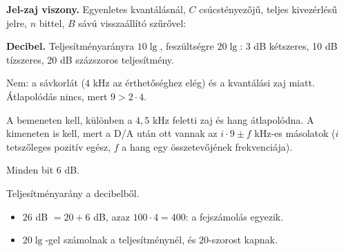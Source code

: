 \begin{elmelet}
\textbf{Jel-zaj viszony.} Egyenletes kvantálásnál, $C$ csúcstényezőjű, teljes kivezérlésű jelre, $n$ bittel, $B$ sávú visszaállító szűrővel:
\begin{center}\end{center}


\textbf{Decibel.} Teljesítményarányra $10\lg$, feszültségre $20\lg$: 3 dB kétszeres, 10 dB tízszeres, 20 dB százszoros teljesítmény.
\end{elmelet}

Nem: a sávkorlát ($4$ kHz az érthetőséghez elég) és a kvantálási zaj miatt. Átlapolódás nincs, mert $9>2\cdot4$.

A bemeneten kell, különben a $4{,}5$ kHz feletti zaj és hang átlapolódna. A kimeneten is kell, mert a D/A után ott vannak az $i\cdot9\pm f$ kHz-es másolatok ($i$ tetszőleges pozitív egész, $f$ a hang egy összetevőjének frekvenciája).

Minden bit $6$ dB.

\begin{center}\end{center}

Teljesítményarány a decibelből.

\begin{center}\end{center}
\begin{eredmeny}

\begin{center}\end{center}
\end{eredmeny}
\begin{tipp}[Ellenőrzés]
\begin{itemize}
\item $26$ dB $=20+6$ dB, azaz $100\cdot4=400$: a fejszámolás egyezik.
\end{itemize}
\end{tipp}
\begin{figyelem}
\begin{itemize}
\item $20\lg$-gel számolnak a teljesítménynél, és $20$-szorost kapnak.
\end{itemize}
\end{figyelem}


